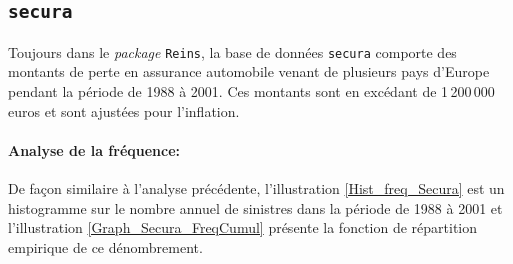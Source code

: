 	\subsection{\texttt{secura}}
		Toujours dans le \textit{package} \texttt{Reins}, la base de données \texttt{secura} comporte des montants de perte en assurance automobile venant de plusieurs pays d'Europe pendant la période de 1988 à 2001. Ces montants sont en excédant de 1\,200\,000 euros et sont ajustées pour l'inflation.
		
		\paragraph{Analyse de la fréquence:}
		De façon similaire à l'analyse précédente, l'illustration \ref{Hist_freq_Secura} est un histogramme sur le nombre annuel de sinistres dans la période de 1988 à 2001 et l'illustration \ref{Graph_Secura_FreqCumul} présente la fonction de répartition empirique de ce dénombrement.
		
